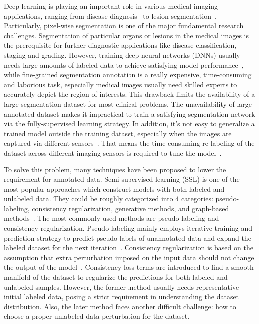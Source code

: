 \documentclass[conference]{IEEEtran}
\begin{document}
\label{sec:intro}

Deep learning is playing an important role in various medical imaging applications, ranging from disease diagnosis~\cite{Yadav2019DeepCN} to lesion segmentation~\cite{shorten2019survey}. 
Particularly, pixel-wise segmentation is one of the major fundamental research challenges. 
Segmentation of particular organs or lesions in the medical images is the prerequisite for further diagnostic applications like disease classification, staging and grading. 
However, training deep neural networks (DNNs) usually needs large amounts of labeled data to achieve satisfying model performance~\cite{shorten2019survey}, while fine-grained segmentation annotation is a really expensive, time-consuming and laborious task, especially medical images usually need skilled experts to accurately depict the region of interests. 
This drawback limits the availability of a large segmentation dataset for most clinical problems. The unavailability of large annotated dataset makes it impractical to train a satisfying segmentation network via the fully-supervised learning strategy. 
In addition, it's not easy to generalize a trained model outside the training dataset, especially when the images are captured via different sensors~\cite{Aggarwal2021DiagnosticAO}. 
That means the time-consuming re-labeling of the dataset across different imaging sensors is required to tune the model~\cite{zhuang2020comprehensive}. 

To solve this problem, many techniques have been proposed to lower the requirement for annotated data. Semi-supervised learning (SSL) is one of the most popular approaches which construct models with both labeled and unlabeled data. They could be roughly categorized into 4 categories: pseudo-labeling, consistency regularization, generative methods, and graph-based methods~\cite{Yang2021ASO}. The most commonly-used methods are pseudo-labeling and consistency regularization. Pseudo-labeling mainly employs iterative training and prediction strategy to predict pseudo-labels of unannotated data and expand the labeled dataset for the next iteration~\cite{Yang2021ASO}. Consistency regularization is based on the assumption that extra perturbation imposed on the input data should not change the output of the model~\cite{Yang2021ASO}. Consistency loss terms are introduced to find a smooth manifold of the dataset to regularize the predictions for both labeled and unlabeled samples. However, the former method usually needs representative initial labeled data, posing a strict requirement in understanding the dataset distribution. Also, the later method faces another difficult challenge: how to choose a proper unlabeled data perturbation for the dataset. 
\end{document}
